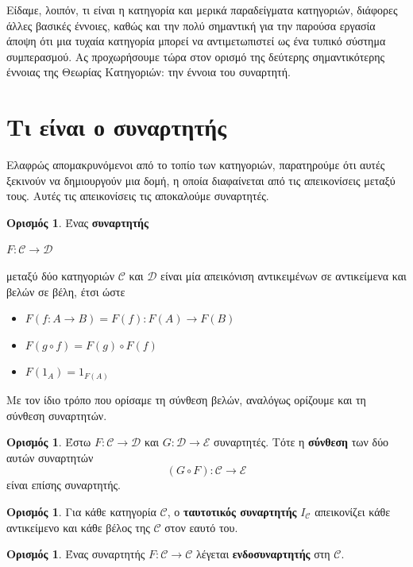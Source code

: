 \documentclass [a4paper,11pt] {book}
\theoremstyle{definition}
\theoremstyle{definition}
\newtheorem{definition}[theorem]{Ορισμός}
\begin{document}
Είδαμε, λοιπόν, τι είναι η κατηγορία και μερικά παραδείγματα κατηγοριών, διάφορες άλλες βασικές έννοιες, καθώς και την πολύ σημαντική για την παρούσα εργασία άποψη ότι μια τυχαία κατηγορία μπορεί να αντιμετωπιστεί ως ένα τυπικό σύστημα συμπερασμού. Ας προχωρήσουμε τώρα στον ορισμό της δεύτερης σημαντικότερης έννοιας της Θεωρίας Κατηγοριών: την έννοια του συναρτητή.
\section{Τι είναι ο συναρτητής}
\label{whatAFunctorIs}
Ελαφρώς απομακρυνόμενοι από το τοπίο των κατηγοριών, παρατηρούμε ότι αυτές ξεκινούν να δημιουργούν μια δομή, η οποία διαφαίνεται από τις απεικονίσεις μεταξύ τους. Αυτές τις απεικονίσεις τις αποκαλούμε συναρτητές.
\begin{definition}\label{functor}
Ένας \textbf{συναρτητής}
\begin{center}
$F:\mathcal{C}\to \mathcal{D}$
\end{center}
μεταξύ δύο κατηγοριών $\mathcal{C}$ και $\mathcal{D}$ είναι μία απεικόνιση αντικειμένων σε αντικείμενα και βελών σε βέλη, έτσι ώστε
\begin{itemize}
\item $F(f:A \to B)=F(f): F(A) \to F(B)$
\item $F(g \circ f)=F(g) \circ F(f)$
\item $F(1_{A})=1_{F(A)}$
\end{itemize}
\end{definition}
Με τον ίδιο τρόπο που ορίσαμε τη σύνθεση βελών, αναλόγως ορίζουμε και τη σύνθεση συναρτητών.
\begin{definition}\label{compositionOfFunctors}
Έστω $F:\mathcal{C}\to\mathcal{D}$ και $G:\mathcal{D}\to\mathcal{E}$ συναρτητές. Τότε η \textbf{σύνθεση} των δύο αυτών συναρτητών \begin{equation*}
(G\circ F):\mathcal{C}\to\mathcal{E}
\end{equation*}
είναι επίσης συναρτητής.
\end{definition}
\begin{definition}\label{unitaryFunctor}
Για κάθε κατηγορία $\mathcal{C}$, ο \textbf{ταυτοτικός συναρτητής} $I_{\mathcal{C}}$ απεικονίζει κάθε αντικείμενο και κάθε βέλος της $\mathcal{C}$ στον εαυτό του.
\end{definition}
\begin{definition}\label{endofunctor}
Ένας συναρτητής $F:\mathcal{C}\to\mathcal{C}$ λέγεται \textbf{ενδοσυναρτητής} στη $\mathcal{C}$.
\end{definition}
\end{document}
